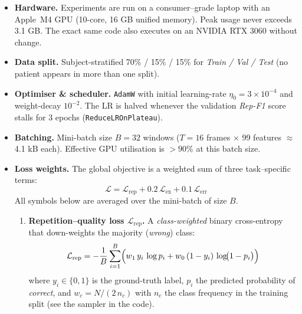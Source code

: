 \documentclass{article}
\begin{document}
\begin{itemize}[leftmargin=1.5em, itemsep=4pt]
  \item \textbf{Hardware.}  
        Experiments are run on a consumer–grade laptop with an \mbox{Apple M4}  
        GPU (10-core, 16 GB unified memory).  Peak usage never exceeds 3.1 GB.  
        The exact same code also executes on an NVIDIA RTX 3060 without change.

  \item \textbf{Data split.}  
        Subject-stratified  
        70\% / 15\% / 15\% for \textit{Train / Val / Test}   
        (no patient appears in more than one split).

  \item \textbf{Optimiser \& scheduler.}  
        \texttt{AdamW} with initial learning-rate  
        $\eta_0 = 3\times10^{-4}$ and weight-decay $10^{-2}$.  
        The LR is halved whenever the validation \textit{Rep-F1} score  
        stalls for 3 epochs (\texttt{ReduceLROnPlateau}).

  \item \textbf{Batching.}  
        Mini-batch size $B = 32$ windows  
        ($T\!=\!16$ frames $\times$ 99 features $\approx$ 4.1 kB each).  
        Effective GPU utilisation is ${>}90$\% at this batch size.

  \item \textbf{Loss weights.}  The global objective is a
weighted sum of three task–specific terms:
\begin{equation}
  \mathcal{L}
  = \mathcal{L}_{\text{rep}}
  + 0.2\,\mathcal{L}_{\text{ex}}
  + 0.1\,\mathcal{L}_{\text{err}}
  \label{eq:loss}
\end{equation}
All symbols below are averaged over the mini-batch of size $B$.

\begin{enumerate}[label=\alph*)]
  \item \textbf{Repetition–quality loss
        $\mathcal{L}_{\text{rep}}$.}  
        A \emph{class-weighted} binary cross-entropy that down-weights
        the majority (\textit{wrong}) class:  
        \begin{equation}
          \mathcal{L}_{\text{rep}}
          = -\frac{1}{B}\sum_{i=1}^{B}
            \Bigl(
              w_{1}\,y_{i}\,\log p_{i}
              +
              w_{0}\,(1-y_{i})\,\log\!\bigl(1-p_{i}\bigr)
            \Bigr)
          \label{eq:rep_loss}
        \end{equation}
        where $y_{i}\!\in\!\{0,1\}$ is the ground-truth label,
        $p_{i}$ the predicted probability of
        \textit{correct}, and
        $w_{c}=N/(2\,n_{c})$ with $n_{c}$ the class frequency in the
        training split (see the sampler in the code).


\end{enumerate}
\end{itemize}
\end{document}

